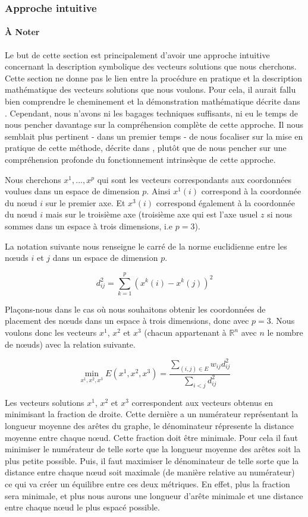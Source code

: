 \documentclass[a4paper, 11pt]{article}
\begin{document}
\subsubsection{Approche intuitive}
\paragraph{À Noter}
Le but de cette section est principalement d'avoir une approche intuitive concernant la description symbolique des vecteurs solutions que nous cherchons. Cette section ne donne pas le lien entre la procédure en pratique et la description mathématique des vecteurs solutions que nous voulons. Pour cela, il aurait fallu bien comprendre le cheminement et la démonstration mathématique décrite dans \cite{spectral_theorie}. Cependant, nous n'avons ni les bagages techniques suffisants, ni eu le temps de nous pencher davantage sur la compréhension complète de cette approche. Il nous semblait plus pertinent - dans un premier temps - de nous focaliser sur la mise en pratique de cette méthode, décrite dans \cite{spectral_pratique}, plutôt que de nous pencher sur une compréhension profonde du fonctionnement intrinsèque de cette approche.


Nous cherchons $x^1,...,x^p$ qui sont les vecteurs correspondants aux coordonnées voulues dans un espace de dimension $p$. Ainsi $x^1(i)$ correspond à la coordonnée du nœud $i$ sur le premier axe. Et $x^3(i)$ correspond également à la coordonnée du nœud $i$ mais sur le troisième axe (troisième axe qui est l'axe usuel $z$ si nous sommes dans un espace à trois dimensions, i.e $p=3$).

La notation suivante nous renseigne le carré de la norme euclidienne entre les nœuds $i$ et $j$ dans un espace de dimension $p$.

\[
d_{ij}^{2} = \sum_{k=1}^{p} (x^k(i) - x^k(j))^{2}
\]

Plaçons-nous dans le cas où nous souhaitons obtenir les coordonnées de placement des nœuds dans un espace à trois dimensions, donc avec $p=3$. Nous voulons donc les vecteurs $x^1$, $x^2$ et $x^3$ (chacun appartenant à $\mathbb{R}^{n}$ avec $n$ le nombre de nœuds) avec la relation suivante.

\[
\min_{x^1, x^2, x^3} E(x^1, x^2, x^3) = \frac{\sum_{(i,j)\in E} w_{ij}d_{ij}^2 }{ \sum_{i<j} d_{ij}^2}
\]

Les vecteurs solutions $x^1$, $x^2$ et $x^3$ correspondent aux vecteurs obtenus en minimisant la fraction de droite. Cette dernière a un numérateur représentant la longueur moyenne des arêtes du graphe, le dénominateur répresente la distance moyenne entre chaque nœud. Cette fraction doit être minimale. Pour cela il faut minimiser le numérateur de telle sorte que la longueur moyenne des arêtes soit la plus petite possible. Puis, il faut maximiser le dénominateur de telle sorte que la distance entre chaque nœud soit maximale (de manière relative au numérateur) ce qui va créer un équilibre entre ces deux métriques. En effet, plus la fraction sera minimale, et plus nous aurons une longueur d'arête minimale et une distance entre chaque nœud le plus espacé possible.
\end{document}
